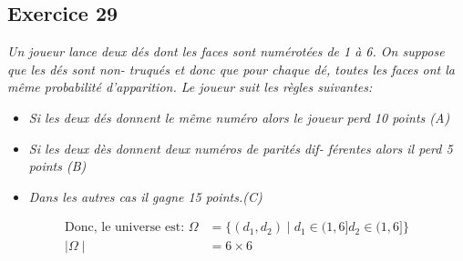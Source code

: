 \subsection*{Exercice 29} %
\textit{Un joueur lance deux dés dont les faces sont numérotées de 1 à 6. On suppose que les dés sont non- truqués et donc que pour chaque dé, toutes les faces ont la même probabilité d’apparition. Le joueur suit les règles suivantes:}
\begin{itemize}
    \item \textit{Si les deux dés donnent le même numéro alors le joueur perd 10 points (A)}
    \item \textit{Si les deux dès donnent deux numéros de parités dif- férentes alors il perd 5 points (B)}
    \item \textit{Dans les autres cas il gagne 15 points.(C)}
\end{itemize}
\begin{align*}
    \text{Donc, le universe est:  } \Omega &= \{(d_1, d_2) \mid d_1 \in (1, 6] d_2 \in (1,6]\} \\
    \mid\Omega\mid &= 6 \times 6
\end{align*}
